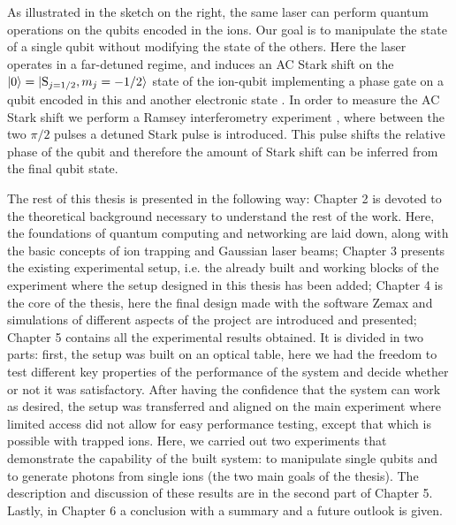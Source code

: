 \documentclass[english, a4paper, 12pt, twoside]{book}
\numberwithin{equation}{section} %
\begin{document}
As illustrated in the sketch on the right, the same laser can perform quantum operations on the qubits encoded in the ions. Our goal is to manipulate the state of a single qubit without modifying the state of the others. Here the laser operates in a far-detuned regime, and induces an AC Stark shift on the $\ket{0} = \ket{\text{S}_{j=1/2}, m_j=-1/2}$ state of the ion-qubit implementing a phase gate on a qubit encoded in this and another electronic state \cite{chuang}. In order to measure the AC Stark shift we perform a Ramsey interferometry experiment \cite{starkshift}, where between the two $\pi/2$ pulses a detuned Stark pulse is introduced. This pulse shifts the relative phase of the qubit and therefore the amount of Stark shift can be inferred from the final qubit state.\par
The rest of this thesis is presented in the following way: Chapter 2 is devoted to the theoretical background necessary to understand the rest of the work. Here, the foundations of quantum computing and networking are laid down, along with the basic concepts of ion trapping and Gaussian laser beams; Chapter 3 presents the existing experimental setup, i.e. the already built and working blocks of the experiment where the setup designed in this thesis has been added; Chapter 4 is the core of the thesis, here the final design made with the software Zemax and simulations of different aspects of the project are introduced and presented; Chapter 5 contains all the experimental results obtained. It is divided in two parts: first, the setup was built on an optical table, here we had the freedom to test different key properties of the performance of the system and decide whether or not it was satisfactory. After having the confidence that the system can work as desired, the setup was transferred and aligned on the main experiment where limited access did not allow for easy performance testing, except that which is possible with trapped ions. Here, we carried out two experiments that demonstrate the capability of the built system: to manipulate single qubits and to generate photons from single ions (the two main goals of the thesis). The description and discussion of these results are in the second part of Chapter 5. Lastly, in Chapter 6 a conclusion with a summary and a future outlook is given.







\end{document}
